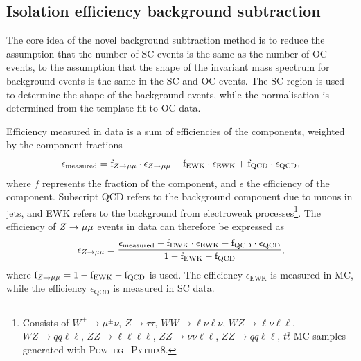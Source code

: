 \subsection{Isolation efficiency background subtraction}

The core idea of the novel background subtraction method is to
reduce the assumption that the number of SC events is the same as
the number of OC events, to the assumption that the shape of the
invariant mass spectrum for background events is the same in the
SC and OC events. The SC region is used to determine the shape
of the background events, while the normalisation is determined
from the template fit to OC data.

Efficiency measured in data is a sum of efficiencies of the
components, weighted by the component fractions
\begin{equation}
\epsilon_\text{measured} =
\text{f}_{Z \rightarrow \mu\mu}   \cdot \epsilon_{Z \rightarrow \mu\mu} +
\text{f}_\text{EWK} \cdot \epsilon_\text{EWK} + 
\text{f}_\text{QCD} \cdot \epsilon_\text{QCD},
\end{equation}
where $f$ represents the fraction of the component, and $\epsilon$
the efficiency of the component. Subscript QCD refers to the
background component due to muons in jets, and EWK refers to the
background from electroweak processes\footnote{Consists of
$W^\pm\rightarrow\mu^\pm \nu$, $Z\rightarrow \tau\tau$,
$WW\rightarrow \ell \nu \ell \nu$, $WZ\rightarrow \ell \nu \ell \ell$,
$WZ\rightarrow qq \ell \ell$, $ZZ\rightarrow\ell\ell\ell\ell$,
$ZZ\rightarrow\nu\nu\ell\ell$, $ZZ\rightarrow qq\ell\ell$,
$t\bar t$ MC samples generated with \textsc{Powheg}+\textsc{Pythia}8.}.
The efficiency of $Z \rightarrow \mu\mu$ events in data can therefore be expressed as
\begin{equation}
\epsilon_{Z \rightarrow \mu\mu} = \frac
{\epsilon_\text{measured} - \text{f}_\text{EWK} \cdot \epsilon_\text{EWK} - \text{f}_\text{QCD} \cdot \epsilon_\text{QCD}}
{1 - \text{f}_\text{EWK} - \text{f}_\text{QCD}},
\end{equation}
where $\text{f}_{Z \rightarrow \mu\mu} = 1 - \text{f}_\text{EWK} - \text{f}_\text{QCD}$
is used. The efficiency $\epsilon_\text{EWK}$ is measured in MC,
while the efficiency $\epsilon_\text{QCD}$ is measured in SC data.

